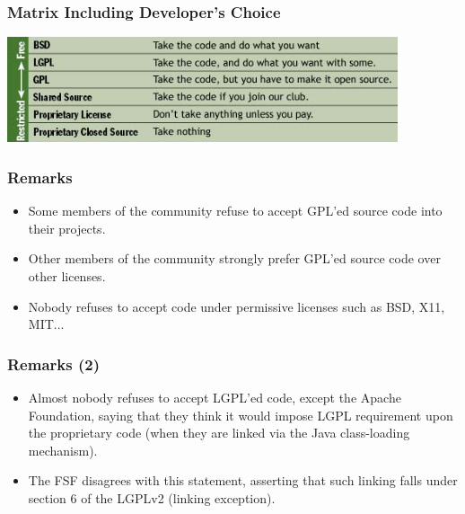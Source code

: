 
\begin{frame}
\frametitle{Matrix Including Developer's Choice}

\begin{center}
\includegraphics[width=11.5cm]{figs/matrix_developers_choice.png}
\end{center}

\end{frame}



\begin{frame}
\frametitle{Remarks}

\begin{itemize}
\item Some members of the community refuse to accept GPL'ed source code into their projects.
\item Other members of the community strongly prefer GPL'ed source code over other licenses.
\item Nobody refuses to accept code under permissive licenses such as BSD, X11, MIT... 
\end{itemize}

\end{frame}


\begin{frame}
\frametitle{Remarks (2)}

\begin{itemize}
\item Almost nobody refuses to accept LGPL'ed code, except the Apache Foundation, saying that they think it would impose LGPL requirement upon the proprietary code (when they are linked via the Java class-loading mechanism).
\item The FSF disagrees with this statement, asserting that such linking falls under section 6 of the LGPLv2 (linking exception).
\end{itemize}

\end{frame}

